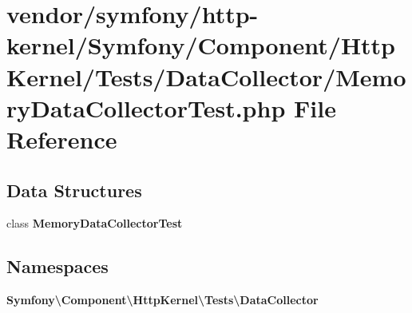 \section{vendor/symfony/http-\/kernel/\+Symfony/\+Component/\+Http\+Kernel/\+Tests/\+Data\+Collector/\+Memory\+Data\+Collector\+Test.php File Reference}
\label{_memory_data_collector_test_8php}
\subsection*{Data Structures}
\begin{DoxyCompactItemize}
\item 
class {\bf Memory\+Data\+Collector\+Test}
\end{DoxyCompactItemize}
\subsection*{Namespaces}
\begin{DoxyCompactItemize}
\item 
 {\bf Symfony\textbackslash{}\+Component\textbackslash{}\+Http\+Kernel\textbackslash{}\+Tests\textbackslash{}\+Data\+Collector}
\end{DoxyCompactItemize}
